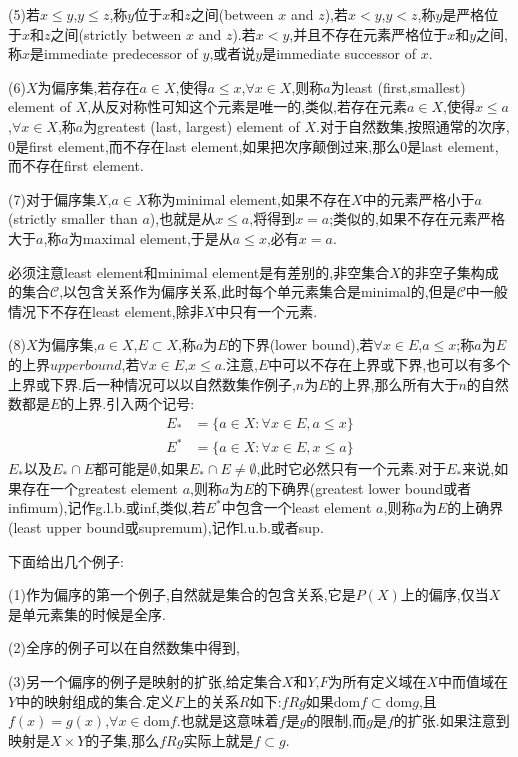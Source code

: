 \documentclass[12pt,a4paper,openany]{book}
\begin{document}
(5)若$x \le y$,$y \le z$,称$y$位于$x$和$z$之间(between $x$ and $z$),若$x<y$,$y<z$,称$y$是严格位于$x$和$z$之间(strictly between $x$ and $z$).若$x<y$,并且不存在元素严格位于$x$和$y$之间,称$x$是immediate predecessor of $y$,或者说$y$是immediate successor of $x$.

(6)$X$为偏序集,若存在$a \in X$,使得$a \le x$,$\forall x \in X$,则称$a$为least (first,smallest) element of $X$,从反对称性可知这个元素是唯一的,类似,若存在元素$a \in X$,使得$x \le a$,$\forall x \in X$,称$a$为greatest (last, largest) element of $X$.对于自然数集,按照通常的次序,$0$是first element,而不存在last element,如果把次序颠倒过来,那么$0$是last element,而不存在first element.

(7)对于偏序集$X$,$a \in X$称为minimal element,如果不存在$X$中的元素严格小于$a$ (strictly smaller than $a$),也就是从$x \le a$,将得到$x=a$;类似的,如果不存在元素严格大于$a$,称$a$为maximal element,于是从$a \le x$,必有$x=a$.

必须注意least element和minimal element是有差别的,非空集合$X$的非空子集构成的集合$\mathscr{C}$,以包含关系作为偏序关系,此时每个单元素集合是minimal的,但是$\mathscr{C}$中一般情况下不存在least element,除非$X$中只有一个元素.

(8)$X$为偏序集,$a \in X$,$E \subset X$,称$a$为$E$的下界(lower bound),若$\forall x \in E$,$a \le x$;称$a$为$E$的上界$upper bound$,若$\forall x \in E$,$x \le a$.注意,$E$中可以不存在上界或下界,也可以有多个上界或下界.后一种情况可以以自然数集作例子,$n$为$E$的上界,那么所有大于$n$的自然数都是$E$的上界.引入两个记号:
\[
\begin{aligned}
E_*&=\{a \in X:\forall x \in E, a \le x\} \\
E^*&=\{a \in X:\forall x \in E, x \le a\}
\end{aligned}
\]
$E_*$以及$E_* \cap E$都可能是$\emptyset$,如果$E_* \cap E \neq \emptyset$,此时它必然只有一个元素.对于$E_*$来说,如果存在一个greatest element $a$,则称$a$为$E$的下确界(greatest lower bound或者infimum),记作g.l.b.或inf,类似,若$E^*$中包含一个least element $a$,则称$a$为$E$的上确界(least upper bound或supremum),记作l.u.b.或者sup.

下面给出几个例子:

(1)作为偏序的第一个例子,自然就是集合的包含关系,它是$P(X)$上的偏序,仅当$X$是单元素集的时候是全序.

(2)全序的例子可以在自然数集中得到,

(3)另一个偏序的例子是映射的扩张,给定集合$X$和$Y$,$F$为所有定义域在$X$中而值域在$Y$中的映射组成的集合.定义$F$上的关系$R$如下:$fRg$如果$\text{dom}{f} \subset \text{dom}{g}$,且$f(x)=g(x)$,$\forall x \in \text{dom}{f}$.也就是这意味着$f$是$g$的限制,而$g$是$f$的扩张.如果注意到映射是$X \times Y$的子集,那么$fRg$实际上就是$f \subset g$.
\end{document}
